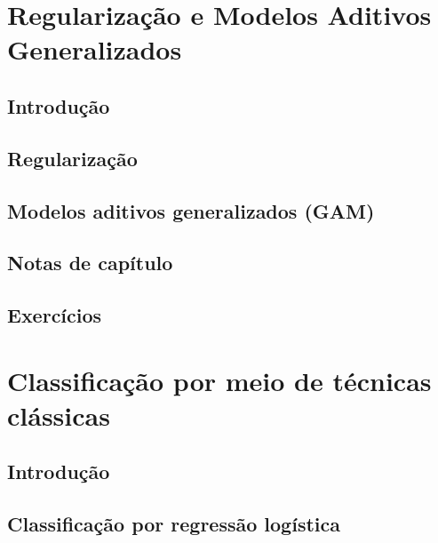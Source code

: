 \documentclass[
]{latex/krantz}
\theoremstyle{definition}
\theoremstyle{definition}
\theoremstyle{definition}
\theoremstyle{definition}
\theoremstyle{remark}
\begin{document}
\hypertarget{regularizauxe7uxe3o-e-modelos-aditivos-generalizados}{%
\chapter{Regularização e Modelos Aditivos Generalizados}\label{regularizauxe7uxe3o-e-modelos-aditivos-generalizados}}

\hypertarget{introduuxe7uxe3o-6}{%
\section{Introdução}\label{introduuxe7uxe3o-6}}

\hypertarget{regularizauxe7uxe3o}{%
\section{Regularização}\label{regularizauxe7uxe3o}}

\hypertarget{modelos-aditivos-generalizados-gam}{%
\section{Modelos aditivos generalizados (GAM)}\label{modelos-aditivos-generalizados-gam}}

\hypertarget{notas-de-capuxedtulo-6}{%
\section{Notas de capítulo}\label{notas-de-capuxedtulo-6}}

\hypertarget{exercuxedcios-6}{%
\section{Exercícios}\label{exercuxedcios-6}}

\hypertarget{classificauxe7uxe3o-por-meio-de-tuxe9cnicas-cluxe1ssicas}{%
\chapter{Classificação por meio de técnicas clássicas}\label{classificauxe7uxe3o-por-meio-de-tuxe9cnicas-cluxe1ssicas}}

\hypertarget{introduuxe7uxe3o-7}{%
\section{Introdução}\label{introduuxe7uxe3o-7}}

\hypertarget{classificauxe7uxe3o-por-regressuxe3o-loguxedstica}{%
\section{Classificação por regressão logística}\label{classificauxe7uxe3o-por-regressuxe3o-loguxedstica}}
\end{document}
